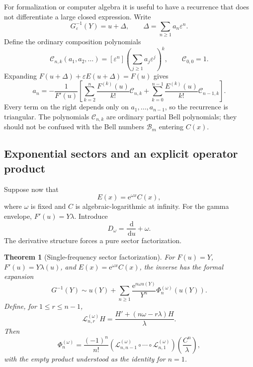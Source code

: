 \documentclass[11pt]{article}
\numberwithin{equation}{section}
\theoremstyle{mainthm}
\newtheorem{theorem}{Theorem}[section]
\theoremstyle{defstyle}
\theoremstyle{remark}
\newcommand{\e}{\mathrm e}
\newcommand{\dd}{\,\mathrm d}
\newcommand{\Bell}{\mathcal B}
\begin{document}
For formalization or computer algebra it is useful to have a recurrence that does not differentiate a large closed expression.  Write
\begin{equation}\label{eq:Delta-series}
 G_\varepsilon^{-1}(Y)=u+\Delta,
 \qquad \Delta=\sum_{n\ge1}a_n\varepsilon^n.
\end{equation}
Define the ordinary composition polynomials
\begin{equation}\label{eq:composition-polynomials}
 \mathcal C_{n,k}(a_1,a_2,\ldots)
 =[\varepsilon^n]\left(\sum_{j\ge1}a_j\varepsilon^j\right)^k,
 \qquad \mathcal C_{0,0}=1.
\end{equation}
Expanding \(F(u+\Delta)+\varepsilon E(u+\Delta)=F(u)\) gives
\begin{equation}\label{eq:additive-recurrence}
 a_n=-\frac1{F'(u)}\left[
 \sum_{k=2}^{n}\frac{F^{(k)}(u)}{k!}\mathcal C_{n,k}
 +\sum_{k=0}^{n-1}\frac{E^{(k)}(u)}{k!}\mathcal C_{n-1,k}
 \right].
\end{equation}
Every term on the right depends only on \(a_1,\ldots,a_{n-1}\), so the recurrence is triangular.  The polynomials \(\mathcal C_{n,k}\) are ordinary partial Bell polynomials; they should not be confused with the Bell numbers \(\Bell_m\) entering \(C(x)\).

\subsection{Exponential sectors and an explicit operator product}

Suppose now that
\begin{equation}\label{eq:E-omega}
 E(x)=\e^{\omega x}C(x),
\end{equation}
where \(\omega\) is fixed and \(C\) is algebraic-logarithmic at infinity.  For the gamma envelope, \(F'(u)=Y\lambda\).  Introduce
\begin{equation}\label{eq:Domega}
 D_\omega=\frac{\dd}{\dd u}+\omega.
\end{equation}
The derivative structure forces a pure sector factorization.

\begin{theorem}[Single-frequency sector factorization]\label{thm:single-frequency-factorization}
For \(F(u)=Y\), \(F'(u)=Y\lambda(u)\), and \(E(x)=\e^{\omega x}C(x)\), the inverse has the formal expansion
\begin{equation}\label{eq:single-sector-transseries}
 G^{-1}(Y)
 \sim u(Y)+\sum_{n\ge1}\frac{\e^{n\omega u(Y)}}{Y^n}
 \Phi_n^{(\omega)}(u(Y)).
\end{equation}
Define, for \(1\le r\le n-1\),
\begin{equation}\label{eq:Lnr-operator}
 \mathcal L_{n,r}^{(\omega)}H
 =\frac{H'+(n\omega-r\lambda)H}{\lambda}.
\end{equation}
Then
\begin{equation}\label{eq:Phi-operator-product}
 \boxed{
 \Phi_n^{(\omega)}
 =\frac{(-1)^n}{n!}
 \left(\mathcal L_{n,n-1}^{(\omega)}\circ\cdots\circ
 \mathcal L_{n,1}^{(\omega)}\right)
 \left(\frac{C^n}{\lambda}\right),}
\end{equation}
with the empty product understood as the identity for \(n=1\).
\end{theorem}
\end{document}

